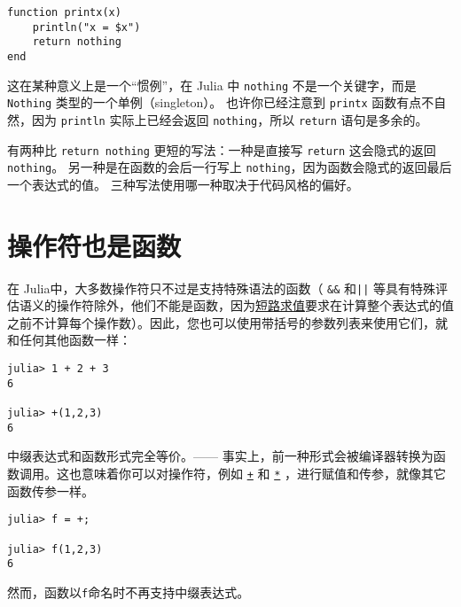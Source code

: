 \begin{verbatim}
function printx(x)
    println("x = $x")
    return nothing
end
\end{verbatim}



这在某种意义上是一个“惯例”，在 Julia 中 \texttt{nothing} 不是一个关键字，而是 \texttt{Nothing} 类型的一个单例（singleton）。 也许你已经注意到 \texttt{printx} 函数有点不自然，因为 \texttt{println} 实际上已经会返回 \texttt{nothing}，所以 \texttt{return} 语句是多余的。



有两种比 \texttt{return nothing} 更短的写法：一种是直接写 \texttt{return} 这会隐式的返回 \texttt{nothing}。 另一种是在函数的会后一行写上 \texttt{nothing}，因为函数会隐式的返回最后一个表达式的值。 三种写法使用哪一种取决于代码风格的偏好。



\hypertarget{6095699413160695994}{}


\section{操作符也是函数}



在 Julia中，大多数操作符只不过是支持特殊语法的函数（ \texttt{\&\&} 和\texttt{||} 等具有特殊评估语义的操作符除外，他们不能是函数，因为\hyperlink{7551496361738057869}{短路求值}要求在计算整个表达式的值之前不计算每个操作数）。因此，您也可以使用带括号的参数列表来使用它们，就和任何其他函数一样：




\begin{verbatim}
julia> 1 + 2 + 3
6

julia> +(1,2,3)
6
\end{verbatim}



中缀表达式和函数形式完全等价。—— 事实上，前一种形式会被编译器转换为函数调用。这也意味着你可以对操作符，例如 \hyperlink{3677358729494553841}{\texttt{+}} 和 \hyperlink{5498506958944335098}{\texttt{*}} ，进行赋值和传参，就像其它函数传参一样。




\begin{verbatim}
julia> f = +;

julia> f(1,2,3)
6
\end{verbatim}



然而，函数以\texttt{f}命名时不再支持中缀表达式。



